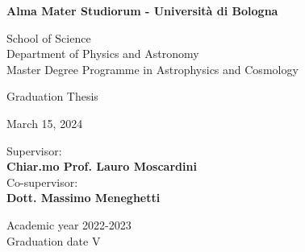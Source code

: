 \thispagestyle{empty}

\begin{center}
    \fontsize{18pt}{18pt}\selectfont
    \textbf{Alma Mater Studiorum - Università di Bologna}
    \par\noindent\hrulefill\vspace{2.5mm}
    
    \Large{School of Science \\ Department of Physics and Astronomy \\ Master Degree Programme in Astrophysics and Cosmology}
    
    \vspace{70mm}
    

    \vspace{5mm}
    
    Graduation Thesis
    
    \vspace{5mm}
    
    March 15, 2024
    
    \vfill
    
    \begin{minipage}[t]{0.34\textwidth}
        \begin{flushleft}
            {}
        \end{flushleft}
    \end{minipage}
    \begin{minipage}[t]{0.64\textwidth}
        \begin{flushright}
            {\fontsize{16pt}{16pt} {Supervisor: \\ \vspace{1mm} \textbf{Chiar.mo Prof. Lauro Moscardini}}} \\
            \vspace{5mm}
            {\fontsize{16pt}{16pt} {Co-supervisor: \\ \vspace{1mm} \textbf{Dott. Massimo Meneghetti}}}
        \end{flushright}
    \end{minipage}
        
    \vspace{10mm}\noindent\hrulefill\vspace{3mm}
    
    \Large{Academic year 2022-2023 \\ Graduation date V}
\end{center}
\restoregeometry